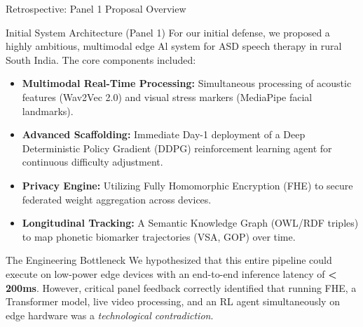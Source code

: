 \documentclass[aspectratio=169, 11pt, xcolor=table]{beamer}
\begin{document}
\begin{frame}{Retrospective: Panel 1 Proposal Overview}
    \vspace{-3mm}
    \begin{block}{Initial System Architecture (Panel 1)}
        \scriptsize
        For our initial defense, we proposed a highly ambitious, multimodal edge Al system for ASD speech therapy in rural South India. The core components included:
        \begin{itemize}
            \item \textbf{Multimodal Real-Time Processing:} Simultaneous processing of acoustic features (Wav2Vec 2.0) and visual stress markers (MediaPipe facial landmarks).
            \item \textbf{Advanced Scaffolding:} Immediate Day-1 deployment of a Deep Deterministic Policy Gradient (DDPG) reinforcement learning agent for continuous difficulty adjustment.
            \item \textbf{Privacy Engine:} Utilizing Fully Homomorphic Encryption (FHE) to secure federated weight aggregation across devices.
            \item \textbf{Longitudinal Tracking:} A Semantic Knowledge Graph (OWL/RDF triples) to map phonetic biomarker trajectories (VSA, GOP) over time.
        \end{itemize}
    \end{block}

    \vspace{2mm}
    \begin{block}{The Engineering Bottleneck}
        \scriptsize
        We hypothesized that this entire pipeline could execute on low-power edge devices with an end-to-end inference latency of \textbf{< 200ms}. However, critical panel feedback correctly identified that running FHE, a Transformer model, live video processing, and an RL agent simultaneously on edge hardware was a \textit{technological contradiction}.
    \end{block}
\end{frame}
\end{document}
